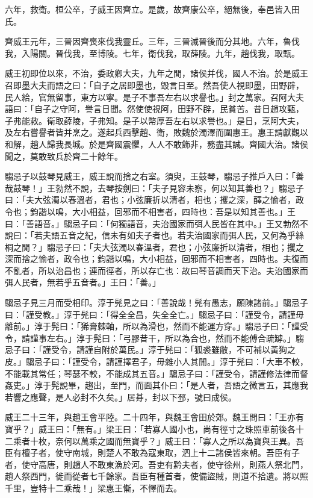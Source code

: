 \begin{pinyinscope}
六年，救衛。桓公卒，子威王因齊立。是歲，故齊康公卒，絕無後，奉邑皆入田氏。

齊威王元年，三晉因齊喪來伐我靈丘。三年，三晉滅晉後而分其地。六年，魯伐我，入陽關。晉伐我，至博陵。七年，衛伐我，取薛陵。九年，趙伐我，取甄。

威王初即位以來，不治，委政卿大夫，九年之閒，諸侯并伐，國人不治。於是威王召即墨大夫而語之曰：「自子之居即墨也，毀言日至。然吾使人視即墨，田野辟，民人給，官無留事，東方以寧。是子不事吾左右以求譽也。」封之萬家。召阿大夫語曰：「自子之守阿，譽言日聞。然使使視阿，田野不辟，民貧苦。昔日趙攻甄，子弗能救。衛取薛陵，子弗知。是子以幣厚吾左右以求譽也。」是日，烹阿大夫，及左右嘗譽者皆并烹之。遂起兵西擊趙、衛，敗魏於濁澤而圍惠王。惠王請獻觀以和解，趙人歸我長城。於是齊國震懼，人人不敢飾非，務盡其誠。齊國大治。諸侯聞之，莫敢致兵於齊二十餘年。

騶忌子以鼓琴見威王，威王說而捨之右室。須臾，王鼓琴，騶忌子推戶入曰：「善哉鼓琴！」王勃然不說，去琴按劍曰：「夫子見容未察，何以知其善也？」騶忌子曰：「夫大弦濁以春溫者，君也；小弦廉折以清者，相也；攫之深，醳之愉者，政令也；鈞諧以鳴，大小相益，回邪而不相害者，四時也：吾是以知其善也。」王曰：「善語音。」騶忌子曰：「何獨語音，夫治國家而弭人民皆在其中。」王又勃然不說曰：「若夫語五音之紀，信未有如夫子者也。若夫治國家而弭人民，又何為乎絲桐之閒？」騶忌子曰：「夫大弦濁以春溫者，君也；小弦廉折以清者，相也；攫之深而捨之愉者，政令也；鈞諧以鳴，大小相益，回邪而不相害者，四時也。夫復而不亂者，所以治昌也；連而徑者，所以存亡也：故曰琴音調而天下治。夫治國家而弭人民者，無若乎五音者。」王曰：「善。」

騶忌子見三月而受相印。淳于髡見之曰：「善說哉！髡有愚志，願陳諸前。」騶忌子曰：「謹受教。」淳于髡曰：「得全全昌，失全全亡。」騶忌子曰：「謹受令，請謹毋離前。」淳于髡曰：「狶膏棘軸，所以為滑也，然而不能運方穿。」騶忌子曰：「謹受令，請謹事左右。」淳于髡曰：「弓膠昔干，所以為合也，然而不能傅合疏罅。」騶忌子曰：「謹受令，請謹自附於萬民。」淳于髡曰：「狐裘雖敝，不可補以黃狗之皮。」騶忌子曰：「謹受令，請謹擇君子，毋雜小人其閒。」淳于髡曰：「大車不較，不能載其常任；琴瑟不較，不能成其五音。」騶忌子曰：「謹受令，請謹修法律而督姦吏。」淳于髡說畢，趨出，至門，而面其仆曰：「是人者，吾語之微言五，其應我若響之應聲，是人必封不久矣。」居朞，封以下邳，號曰成侯。

威王二十三年，與趙王會平陸。二十四年，與魏王會田於郊。魏王問曰：「王亦有寶乎？」威王曰：「無有。」梁王曰：「若寡人國小也，尚有徑寸之珠照車前後各十二乘者十枚，奈何以萬乘之國而無寶乎？」威王曰：「寡人之所以為寶與王異。吾臣有檀子者，使守南城，則楚人不敢為寇東取，泗上十二諸侯皆來朝。吾臣有子者，使守高唐，則趙人不敢東漁於河。吾吏有黔夫者，使守徐州，則燕人祭北門，趙人祭西門，徙而從者七千餘家。吾臣有種首者，使備盜賊，則道不拾遺。將以照千里，豈特十二乘哉！」梁惠王慚，不懌而去。


\end{pinyinscope}
